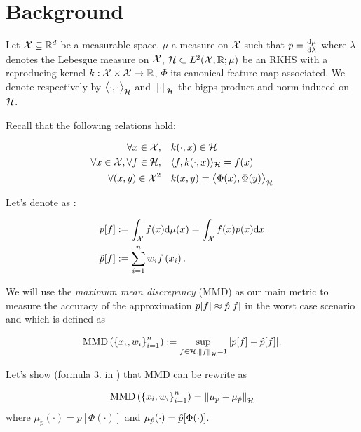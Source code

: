 \section{Background}
Let $\mathcal{X} \subseteq \mathbb{R} ^ { d }$ be a measurable space, $\mu$ a measure on $\mathcal{X}$ such
that $p = \frac{\mathop{}\mathopen{}\mathrm{d} \mu}{ \mathop{}\mathopen{}\mathrm{d} \lambda}$ where $\lambda$ denotes the Lebesgue measure on $\mathcal{X}$,
  $\mathcal{H} \subset L^2(\mathcal{X}, \mathbb{R}; \mu)$ be an RKHS with a
 reproducing kernel $k: \mathcal{X} \times \mathcal{X} \rightarrow \mathbb{R}$, $\Phi$ its canonical feature
 map associated. We denote respectively by $\bigl \langle \cdot , \cdot \bigr \rangle_{\mathcal{H}}$ and $\norme{\cdot}$
 the bigps product and norm induced on $\mathcal{H}$.

 Recall that the following relations hold:
 \begin{boxexercise}
   \begin{align}
  \forall x \in \mathcal{X} , \quad &k ( \cdot , x ) \in \mathcal{H}\\
  \forall x \in \mathcal{X} , \forall f \in \mathcal{H} , \quad &\langle f , k ( \cdot , x ) \rangle _ { \mathcal{H} } = f ( x )\\
  \forall (x,y) \in \mathcal{X}^2 \quad &k(x,y) = \bigl \langle \Phi(x) , \Phi(y) \bigr \rangle_{\mathcal{H}}
  \end{align}
\end{boxexercise}


Let's denote as \cite{FWBQ}:
\begin{boxdefinition}
  \begin{align*}
    p[f] &:= \int _ { \mathcal{X} } f ( x ) \mathrm { d } \mu(x) = \int _ { \mathcal{X} } f ( x ) p ( x ) \mathrm { d } x\\
    \hat{p}[f]&:=\sum _ { i = 1 } ^ { n } w _ { i } f \left( x _ { i } \right).
  \end{align*}
\end{boxdefinition}


We will use the \textit{maximum mean discrepancy} (MMD) as our main metric to measure
 the accuracy of the approximation $p[f] \approx \hat{p}[f]$ in the worst case scenario and which is defined as
 \begin{boxdefinition}
    $$\MMD : = \sup _ { f \in \H : \norme{f}=1 } | p [ f ] - \hat { p } [ f ] |.$$
 \end{boxdefinition}

 Let's show (formula 3. in \cite{FWBQ}) that MMD can be rewrite as
 \begin{boxtheorem}
   \begin{align}
     \label{eq:MMD}
     \operatorname { MMD } \left( \left\{ x _ { i } , w _ { i } \right\} _ { i = 1 } ^ { n } \right) = \left\| \mu _ { p } - \mu _ { \hat { p } } \right\| _ { \mathcal { H } }
   \end{align}
   where $\mu_p(\cdot) = p[\Phi(\cdot)]$ and $\mu_{\hat{p}}(\cdot) = \hat{p}[\Phi(\cdot)]$.
 \end{boxtheorem}

